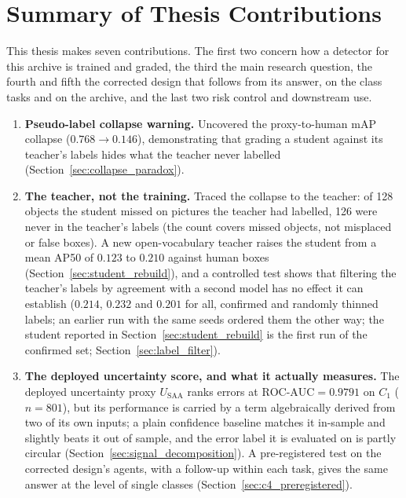 \documentclass[12pt,a4paper]{report}
\begin{document}
\section{Summary of Thesis Contributions}
This thesis makes seven contributions. The first two concern how a detector for this archive is trained and graded, the third the main research question, the fourth and fifth the corrected design that follows from its answer, on the class tasks and on the archive, and the last two risk control and downstream use.
\begin{enumerate}
    \item \textbf{Pseudo-label collapse warning.} Uncovered the proxy-to-human mAP collapse ($0.768 \rightarrow 0.146$), demonstrating that grading a student against its teacher's labels hides what the teacher never labelled (Section~\ref{sec:collapse_paradox}).
    \item \textbf{The teacher, not the training.} Traced the collapse to the teacher: of 128 objects the student missed on pictures the teacher had labelled, 126 were never in the teacher's labels (the count covers missed objects, not misplaced or false boxes). A new open-vocabulary teacher raises the student from a mean AP50 of $0.123$ to $0.210$ against human boxes (Section~\ref{sec:student_rebuild}), and a controlled test shows that filtering the teacher's labels by agreement with a second model has no effect it can establish ($0.214$, $0.232$ and $0.201$ for all, confirmed and randomly thinned labels; an earlier run with the same seeds ordered them the other way; the student reported in Section~\ref{sec:student_rebuild} is the first run of the confirmed set; Section~\ref{sec:label_filter}).
    \item \textbf{The deployed uncertainty score, and what it actually measures.} The deployed uncertainty proxy $U_{\text{SAA}}$ ranks errors at $\text{ROC-AUC}=0.9791$ on $C_1$ ($n=801$), but its performance is carried by a term algebraically derived from two of its own inputs; a plain confidence baseline matches it in-sample and slightly beats it out of sample, and the error label it is evaluated on is partly circular (Section~\ref{sec:signal_decomposition}). A pre-registered test on the corrected design's agents, with a follow-up within each task, gives the same answer at the level of single classes (Section~\ref{sec:c4_preregistered}).

\end{enumerate}
\end{document}
